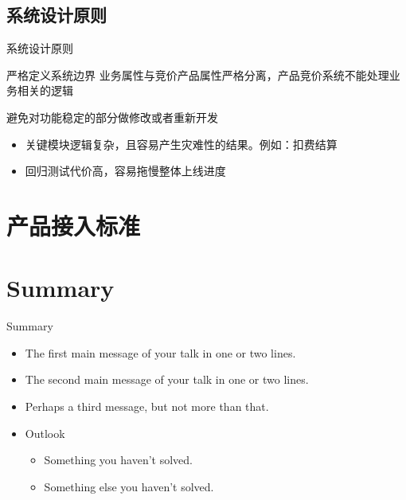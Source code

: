 \documentclass{beamer}
\begin{document}
\begin{CJK}{UTF8}{gbsn}
\subsection{系统设计原则}

\begin{frame}{系统设计原则}
  \begin{block}{严格定义系统边界}
    业务属性与竞价产品属性严格分离，产品竞价系统不能处理业务相关的逻辑
  \end{block}
  \begin{block}{避免对功能稳定的部分做修改或者重新开发}
    \begin{itemize}
      \item {
        关键模块逻辑复杂，且容易产生灾难性的结果。例如：扣费结算
      }
      \item {
        回归测试代价高，容易拖慢整体上线进度
      }
    \end{itemize}
  \end{block}
\end{frame}

\section{产品接入标准} 

\section*{Summary}

\begin{frame}{Summary}
  \begin{itemize}
  \item
    The \alert{first main message} of your talk in one or two lines.
  \item
    The \alert{second main message} of your talk in one or two lines.
  \item
    Perhaps a \alert{third message}, but not more than that.
  \end{itemize}
  
  \begin{itemize}
  \item
    Outlook
    \begin{itemize}
    \item
      Something you haven't solved.
    \item
      Something else you haven't solved.
    \end{itemize}
  \end{itemize}
\end{frame}




\end{CJK}
\end{document}
